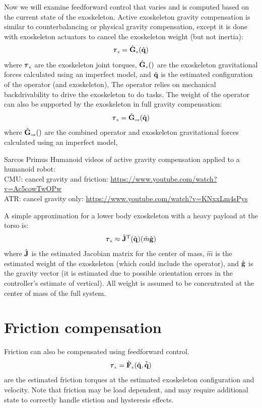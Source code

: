 \documentclass[letterpaper,12pt,fullpage]{article}
\newcommand{\myx}{{\mbox {\tiny x}}}
\newcommand{\ox}{{\mbox {\tiny ox}}}
\begin{document}
Now we will examine feedforward control that varies and is computed based on
the current state of the exoskeleton.
Active exoskeleton gravity compensation is similar 
to counterbalancing or physical gravity compensation, except it is done
with exoskeleton actuators to cancel the exoskeleton weight (but not inertia):
\begin{equation}
\vtau_{\myx} = \hat{\mG}_{\myx}(\hat{\vq})
\end{equation}
where $\vtau_{\myx}$ are the exoskeleton joint torques, 
$\hat{\mG}_{\myx}()$ are the exoskeleton
gravitational forces calculated using an imperfect model, 
and $\hat{{\bf q}}$ is the estimated configuration of the operator (and exoskeleton),
The operator relies on mechanical backdrivability to drive
the exoskeleton to do tasks.
The weight of the operator can also be supported by the exoskeleton in
full gravity compensation:
\begin{equation}
\vtau_{\myx} = \hat{\mG}_{\ox}(\hat{\vq})
\end{equation}
where $\hat{\mG}_{\ox}()$ are the combined operator and exoskeleton
gravitational forces calculated using an imperfect model, 

Sarcos Primus Humanoid videos of active gravity compensation applied
to a humanoid robot:\\
CMU: cancel gravity and friction: \url{https://www.youtube.com/watch?v=Ac5cowTwOPw}\\
ATR: cancel gravity only: \url{https://www.youtube.com/watch?v=KNxxLm4sPys}

A simple approximation for a lower body exoskeleton with a heavy payload at the
torso is:
\begin{equation}
\vtau_{\myx} \approx \hat{\mJ}^{\tr}(\hat{\vq}) (\hat{m} \hat{\vg})
\end{equation}
where $\hat{{\bf J}}$ is the estimated Jacobian matrix for the center of mass,
$\hat{m}$ is the estimated
weight of the exoskeleton (which could include the operator),
and $\hat{{\bf g}}$ is the gravity vector (it is estimated due to possible orientation
errors in the controller's estimate of vertical).
All weight is assumed to be concentrated at the center of mass of the full system.

\section{Friction compensation}

Friction can also be compensated using feedforward control.
\begin{equation}
\vtau_{\myx} = \hat{\mF}_{\myx}(\hat{\vq},\hat{\dot{\vq}}) 
\end{equation}
are the estimated friction torques at the estimated exoskeleton configuration
and velocity.
Note that friction may be load dependent, and may require additional state to
correctly handle stiction and hysteresis effects.
\end{document}
